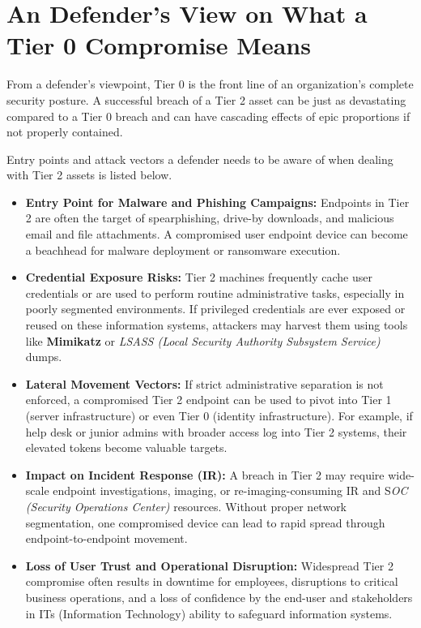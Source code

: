 \section{An Defender's View on What a Tier 0 Compromise Means}
From a defender's viewpoint, Tier 0 is the front line of an organization's complete security posture. A successful breach of a Tier 2 asset can be just as devastating compared to a Tier 0 breach and can have cascading effects of epic proportions if not properly contained.

Entry points and attack vectors a defender needs to be aware of when dealing with Tier 2 assets is listed below.

\begin{itemize}
    \item \textbf{Entry Point for Malware and Phishing Campaigns:} Endpoints in Tier 2 are often the target of spearphishing, drive-by downloads, and malicious email and file attachments. A compromised user endpoint device can become a beachhead for malware deployment or ransomware execution.
    \item \textbf{Credential Exposure Risks:} Tier 2 machines frequently cache user credentials or are used to perform routine administrative tasks, especially in poorly segmented environments. If privileged credentials are ever exposed or reused on these information systems, attackers may harvest them using tools like \textbf{Mimikatz} or \textit{LSASS (Local Security Authority Subsystem Service)} dumps.
    \item \textbf{Lateral Movement Vectors:} If strict administrative separation is not enforced, a compromised Tier 2 endpoint can be used to pivot into Tier 1 (server infrastructure) or even Tier 0 (identity infrastructure). For example, if help desk or junior admins with broader access log into Tier 2 systems, their elevated tokens become valuable targets.
    \item \textbf{Impact on Incident Response (IR):} A breach in Tier 2 may require wide-scale endpoint investigations, imaging, or re-imaging-consuming IR and S\textit{OC (Security Operations Center)} resources. Without proper network segmentation, one compromised device can lead to rapid spread through endpoint-to-endpoint movement.
    \item \textbf{Loss of User Trust and Operational Disruption:} Widespread Tier 2 compromise often results in downtime for employees, disruptions to critical business operations, and a loss of confidence by the end-user and stakeholders in ITs (Information Technology) ability to safeguard information systems.
\end{itemize}
    
